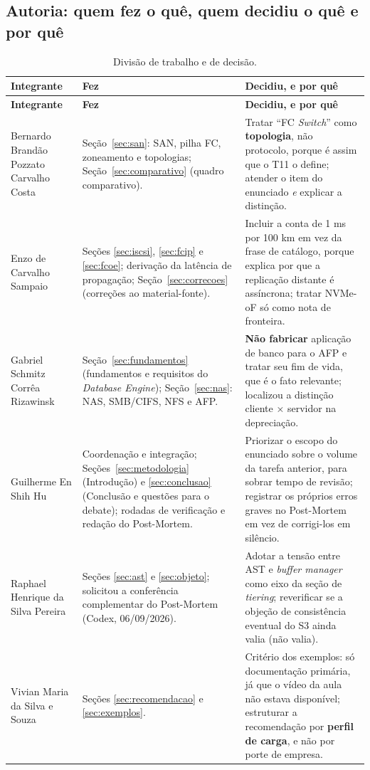 \documentclass[11pt,a4paper]{article}
\begin{document}
\subsection{Autoria: quem fez o quê, quem decidiu o quê e por quê}
\label{sec:autoria}

{\footnotesize
\begin{longtable}{@{}L{3.3cm}L{4.0cm}L{7.5cm}@{}}
\caption{Divisão de trabalho e de decisão.}\label{tab:autoria}\\
\toprule
\textbf{Integrante} & \textbf{Fez} & \textbf{Decidiu, e por quê} \\
\midrule\endfirsthead
\toprule
\textbf{Integrante} & \textbf{Fez} & \textbf{Decidiu, e por quê} \\
\midrule\endhead
Bernardo Brandão Pozzato Carvalho Costa & Seção~\ref{sec:san}: SAN, pilha FC, zoneamento e topologias; Seção~\ref{sec:comparativo} (quadro comparativo). &
Tratar ``FC \textit{Switch}'' como \textbf{topologia}, não protocolo, porque é assim que o T11 o define;
atender o item do enunciado \emph{e} explicar a distinção. \\
\addlinespace
Enzo de Carvalho Sampaio & Seções \ref{sec:iscsi}, \ref{sec:fcip} e \ref{sec:fcoe}; derivação da latência
de propagação; Seção~\ref{sec:correcoes} (correções ao material-fonte). & Incluir a conta de 1 ms por 100 km em vez da frase de catálogo, porque explica por que a
replicação distante é assíncrona; tratar NVMe-oF só como nota de fronteira. \\
\addlinespace
Gabriel Schmitz Corrêa Rizawinsk & Seção~\ref{sec:fundamentos} (fundamentos e requisitos do \textit{Database Engine}); Seção~\ref{sec:nas}: NAS, SMB/CIFS, NFS e AFP. & \textbf{Não fabricar}
aplicação de banco para o AFP e tratar seu fim de vida, que é o fato relevante; localizou a distinção
cliente × servidor na depreciação. \\
\addlinespace
Guilherme En Shih Hu & Coordenação e integração; Seções~\ref{sec:metodologia} (Introdução) e \ref{sec:conclusao} (Conclusão e questões para o debate); rodadas de verificação e redação do Post-Mortem. & Priorizar o escopo do enunciado sobre o volume da tarefa anterior, para sobrar tempo de
revisão; registrar os próprios erros graves no Post-Mortem em vez de corrigi-los em silêncio. \\
\addlinespace
Raphael Henrique da Silva Pereira & Seções \ref{sec:ast} e \ref{sec:objeto}; solicitou a conferência
complementar do Post-Mortem (Codex, 06/09/2026). & Adotar a tensão entre AST e \textit{buffer manager} como
eixo da seção de \textit{tiering}; reverificar se a objeção de consistência eventual do S3 ainda valia (não
valia). \\
\addlinespace
Vivian Maria da Silva e Souza & Seções \ref{sec:recomendacao} e \ref{sec:exemplos}. & Critério dos exemplos:
só documentação primária, já que o vídeo da aula não estava disponível; estruturar a recomendação por
\textbf{perfil de carga}, e não por porte de empresa. \\
\bottomrule
\end{longtable}}
\end{document}
